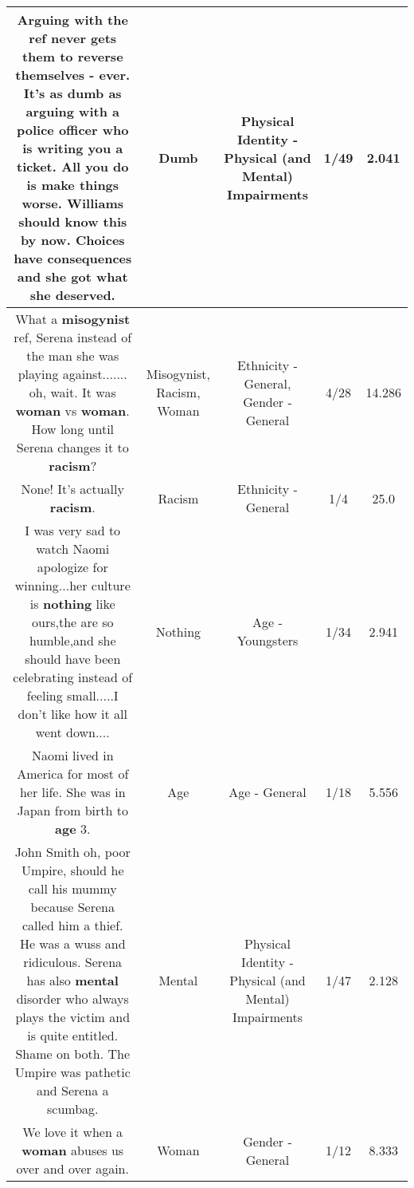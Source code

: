 \documentclass[11pt]{article}
\newlength\mylength
\begin{document}
\begin{center}
\begin{longtable}{|C{.65\mylength}|C{.30\mylength}|C{.12\mylength}|C{.12\mylength}|C{.12\mylength}|}
  \small Arguing with the ref never gets them to reverse themselves - ever. It's as \textbf{dumb} as arguing with a police officer who is writing you a ticket. All you do is make things worse. Williams should know this by now. Choices have consequences and she got what she deserved.\normalsize   & Dumb & Physical Identity - Physical (and Mental) Impairments & 1/49 & 2.041 \\  \hline
  \small What a \textbf{misogynist} ref, Serena instead of the man she was playing against....... oh, wait. It was \textbf{woman} vs \textbf{woman}. How long until Serena changes it to \textbf{racism}?\normalsize   & Misogynist, Racism, Woman & Ethnicity - General, Gender - General & 4/28 & 14.286 \\  \hline
  \small None! It's actually \textbf{racism}.\normalsize   & Racism & Ethnicity - General & 1/4 & 25.0 \\  \hline
  \small I was very sad to watch Naomi apologize for winning...her culture is \textbf{nothing} like ours,the are so humble,and she should have been celebrating instead of feeling small.....I don't like how it all went down....\normalsize   & Nothing & Age - Youngsters & 1/34 & 2.941 \\  \hline
  \small Naomi lived in America for most of her life. She was in Japan from birth to \textbf{age} 3.\normalsize   & Age & Age - General & 1/18 & 5.556 \\  \hline
  \small John Smith oh, poor Umpire, should he call his mummy because Serena called him a thief. He was a wuss and ridiculous. Serena has also \textbf{mental} disorder who always plays the victim and is quite entitled. Shame on both. The Umpire was pathetic and Serena a scumbag.\normalsize   & Mental & Physical Identity - Physical (and Mental) Impairments & 1/47 & 2.128 \\  \hline
  \small We love it when a \textbf{woman} abuses us over and over again.\normalsize   & Woman & Gender - General & 1/12 & 8.333 \\  \hline

\end{longtable}
\end{center}
\end{document}

